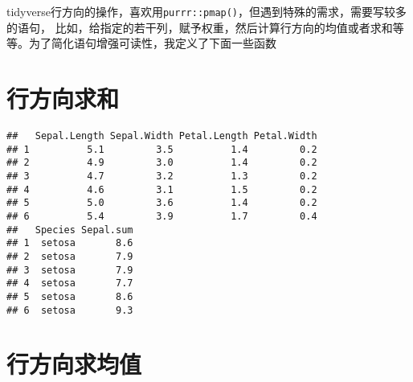 \documentclass[
]{krantz}
\makeatletter
\newenvironment{Shaded}{\begin{snugshade}}{\end{snugshade}}
\newcommand{\DataTypeTok}[1]{\textcolor[rgb]{0.27,0.27,0.27}{#1}}
\newcommand{\KeywordTok}[1]{\textcolor[rgb]{0.27,0.27,0.27}{\textbf{#1}}}
\newcommand{\NormalTok}[1]{#1}
\newcommand{\OperatorTok}[1]{\textcolor[rgb]{0.43,0.43,0.43}{\textbf{#1}}}
\newcommand{\StringTok}[1]{\textcolor[rgb]{0.5,0.5,0.5}{#1}}
\newenvironment{kframe}{%
\medskip{}
\setlength{\fboxsep}{.8em}
 \def\at@end@of@kframe{}%
 \ifinner\ifhmode%
  \def\at@end@of@kframe{\end{minipage}}%
  \begin{minipage}{\columnwidth}%
 \fi\fi%
 \def\FrameCommand##1{\hskip\@totalleftmargin \hskip-\fboxsep
 \colorbox{shadecolor}{##1}\hskip-\fboxsep
     \hskip-\linewidth \hskip-\@totalleftmargin \hskip\columnwidth}%
 \MakeFramed {\advance\hsize-\width
   \@totalleftmargin\z@ \linewidth\hsize
   \@setminipage}}%
 {\par\unskip\endMakeFramed%
 \at@end@of@kframe}
\renewenvironment{Shaded}{\begin{kframe}}{\end{kframe}}
\makeatother
\begin{document}
tidyverse行方向的操作，喜欢用\texttt{purrr::pmap()}，但遇到特殊的需求，需要写较多的语句，
比如，给指定的若干列，赋予权重，然后计算行方向的均值或者求和等等。为了简化语句增强可读性，我定义了下面一些函数

\hypertarget{ux884cux65b9ux5411ux6c42ux548c}{%
\section{行方向求和}\label{ux884cux65b9ux5411ux6c42ux548c}}

\begin{Shaded}
\end{Shaded}

\begin{verbatim}
##   Sepal.Length Sepal.Width Petal.Length Petal.Width
## 1          5.1         3.5          1.4         0.2
## 2          4.9         3.0          1.4         0.2
## 3          4.7         3.2          1.3         0.2
## 4          4.6         3.1          1.5         0.2
## 5          5.0         3.6          1.4         0.2
## 6          5.4         3.9          1.7         0.4
##   Species Sepal.sum
## 1  setosa       8.6
## 2  setosa       7.9
## 3  setosa       7.9
## 4  setosa       7.7
## 5  setosa       8.6
## 6  setosa       9.3
\end{verbatim}

\hypertarget{ux884cux65b9ux5411ux6c42ux5747ux503c}{%
\section{行方向求均值}\label{ux884cux65b9ux5411ux6c42ux5747ux503c}}

\begin{Shaded}
\end{Shaded}
\end{document}
